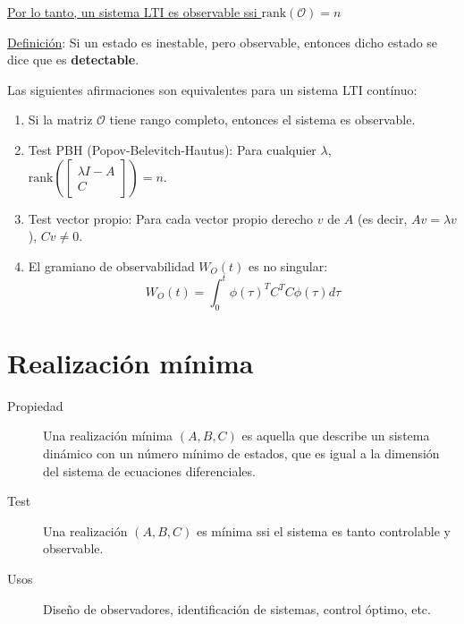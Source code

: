 \par \underline{Por lo tanto, un sistema LTI es observable ssi $\text{rank}(\mathcal{O})=n$}\\

\par \underline{Definición}: Si un estado es inestable, pero observable, entonces dicho estado se dice que es \textbf{detectable}. 

\begin{theorem}
    Las siguientes afirmaciones son equivalentes para un sistema LTI contínuo:
    \begin{enumerate}
        \item Si la matriz $\mathcal{O}$ tiene rango completo, entonces el sistema es observable.
        \item Test PBH (Popov-Belevitch-Hautus): Para cualquier $\lambda$, $\text{rank}\left(\begin{bmatrix}\lambda I - A \\ C\end{bmatrix}\right) = n$.
        \item Test vector propio: Para cada vector propio derecho $v$ de $A$ (es decir, $Av=\lambda v$), $C v \neq 0$.
        \item El gramiano de observabilidad $W_O(t)$ es no singular:
        $$W_O(t) = \int_0^t \phi(\tau)^T C^T C \phi(\tau) d\tau$$
    \end{enumerate}
\end{theorem}

\section{Realización mínima}

\begin{description}
    \item[Propiedad] Una realización mínima $(A,B,C)$ es aquella que describe un sistema dinámico con un número mínimo de estados, que es igual a la dimensión del sistema de ecuaciones diferenciales.
    \item[Test] Una realización $(A,B,C)$ es mínima ssi el sistema es tanto controlable y observable.
    \item[Usos] Diseño de observadores, identificación de sistemas, control óptimo, etc.
\end{description}
